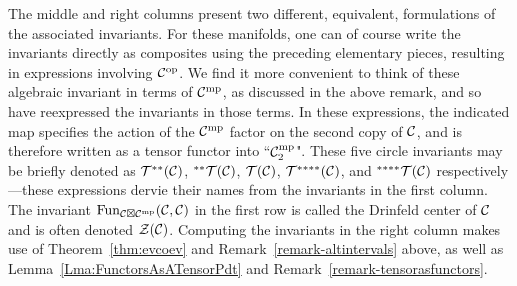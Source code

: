 \documentclass{amsart}
\begin{document}
%
The middle and right columns present two different, equivalent, formulations of the associated invariants.  For these manifolds, one can of course write the invariants directly as composites using the preceding elementary pieces, resulting in expressions involving $\mathcal C^{\mathrm{op}}$.  We find it more convenient to think of these algebraic invariant in terms of $\mathcal C^{\mathrm{mp}}$, as discussed in the above remark, and so have reexpressed the invariants in those terms.  In these expressions, the indicated map specifies the action of the $\mathcal C^{\mathrm{mp}}$ factor on the second copy of $\mathcal C$, and is therefore written as a tensor functor into ``$\mathcal C_2^{\mathrm{mp}}$".  These five circle invariants may be briefly denoted as $\mathcal T^{**}(\mathcal C)$, ${}^{**}\mathcal T(\mathcal C)$, $\mathcal T(\mathcal C)$, $\mathcal T^{****}(\mathcal C)$, and ${}^{****}\mathcal T(\mathcal C)$ respectively---these expressions dervie their names from the invariants in the first column.  The invariant $\operatorname{Fun}_{\mathcal C \boxtimes \mathcal C^{\mathrm{mp}}}(\mathcal C,\mathcal C)$ in the first row is called the Drinfeld center of $\mathcal C$ and is often denoted $\mathcal Z(\mathcal C)$.  Computing the invariants in the right column makes use of Theorem~\ref{thm:evcoev} and Remark~\ref{remark-altintervals} above, as well as Lemma~\ref{Lma:FunctorsAsATensorPdt} and Remark~\ref{remark-tensorasfunctors}.
\end{document}
